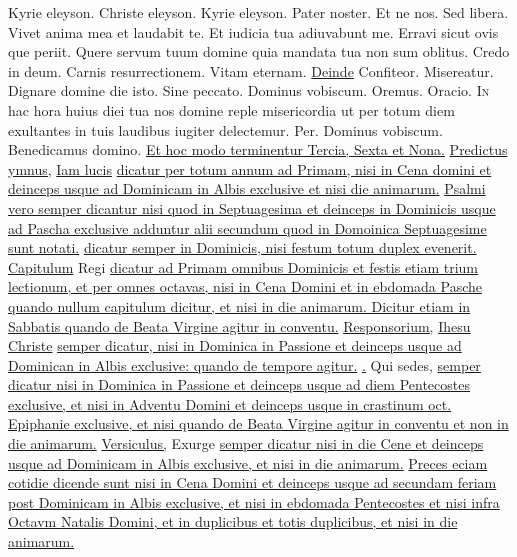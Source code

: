 \begin{multicols*}{2}
\newline Kyrie eleyson. Christe eleyson. Kyrie eleyson. Pater noster. Et ne nos. Sed libera. \V Vivet anima mea et laudabit te. Et iudicia tua adiuvabunt me. \V Erravi sicut ovis que periit. Quere servum tuum domine quia mandata tua non sum oblitus. Credo in deum. Carnis resurrectionem. Vitam eternam. \ul{Deinde} Confiteor. Misereatur. \V Dignare domine die isto. Sine peccato. Dominus vobiscum. Oremus. {\color{Red} Oracio.}
\lettrine[lines=2]{\zallmancaps \color{Red} I}{n} hac hora huius diei tua nos domine reple misericordia ut per totum diem exultantes in tuis laudibus iugiter delectemur. Per. Dominus vobiscum. Benedicamus domino. \ul{Et hoc modo terminentur Tercia, Sexta et Nona.}
\newline \ul{Predictus ymnus,} \hyperlink{iam-lucis}{Iam lucis} \ul{dicatur per totum annum ad Primam, nisi in Cena domini et deinceps usque ad Dominicam in Albis exclusive et nisi die animarum.}
\newline \ul{Psalmi vero semper dicantur nisi quod in Septuagesima et deinceps in Dominicis usque ad Pascha exclusive adduntur alii secundum quod in Domoinica Septuagesime sunt notati.}
\newline {} \ul{dicatur semper in Dominicis, nisi festum totum duplex evenerit.}
\newline \ul{Capitulum} Regi \ul{dicatur ad Primam omnibus Dominicis et festis etiam trium lectionum, et per omnes octavas, nisi in Cena Domini et in ebdomada Pasche quando nullum capitulum dicitur, et nisi in die animarum. Dicitur etiam in Sabbatis quando de Beata Virgine agitur in conventu.}
\newline \ul{Responsorium,} \hyperlink{ihesu-christe-fili}{Ihesu Christe} \ul{semper dicatur, nisi in Dominica in Passione et deinceps usque ad Dominican in Albis exclusive: quando de tempore agitur.}
\newline \ul{\Vbar .} Qui sedes, \ul{semper dicatur nisi in Dominica in Passione et deinceps usque ad diem Pentecostes exclusive, et nisi in Adventu Domini et deinceps usque in crastinum oct. Epiphanie exclusive, et nisi quando de Beata Virgine agitur in conventu et non in die animarum.}
\newline \ul{Versiculus,} Exurge \ul{semper dicatur nisi in die Cene et deinceps usque ad Dominicam in Albis exclusive, et nisi in die animarum.}
\newline \ul{Preces eciam cotidie dicende sunt nisi in Cena Domini et deinceps usque ad secundam feriam post Dominicam in Albis exclusive, et nisi in ebdomada Pentecostes et nisi infra Octavm Natalis Domini, et in duplicibus et totis duplicibus, et nisi in die animarum.}

\end{multicols*}
